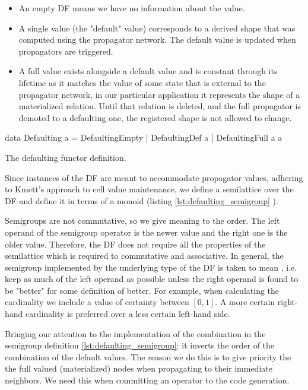 \begin{itemize}
\item An empty DF means we have no information about the value.
\item A single value (the "default" value) corresponds to a derived shape
  that was computed using the propagator network. The default value is
  updated when propagators are triggered.
\item A full value exists alongside a default value and is constant
  through its lifetime as it matches the value of some state that is
  external to the propagator network, in our particular application it
  represents the shape of a materialized relation. Until that relation
  is deleted, and the full propagator is demoted to a defaulting one, the 
  registered shape is not allowed to change.
\end{itemize}

\begin{code}
  \begin{haskellcode}
    data Defaulting a =
      DefaultingEmpty
      | DefaultingDef a
      | DefaultingFull a a
  \end{haskellcode}
  \label{lst:defaulting_functor}
  \caption{The defaulting functor definition.}
\end{code}

Since instances of the DF are meant to accommodate propagator values,
adhering to Kmett's approach to cell value maintenance, we define a
semilattice over the DF and define it in terms of a monoid (listing
\ref{lst:defaulting_semigroup} ).

Semigroups are not commutative, so we give meaning to the order. The
left operand of the semigroup operator is the newer value and the
right one is the older value. Therefore, the DF does not require all
the properties of the semilattice which is required to commutative and
associative. In general, the semigroup implemented by the underlying
type of the DF is taken to mean , i.e. keep as
much of the left operand as possible unless the right operand is found
to be "better" for some definition of better. For example, when calculating 
the cardinality we include a value of certainty between \(\left[0,1\right]\). 
A more certain right-hand cardinality is preferred over a less certain left-hand side. 

Bringing our attention to the implementation of the 
combination in the semigroup definition \ref{lst:defaulting_semigroup}: 
it inverts the order of the combination of the default
values. The reason we do this is to give priority the the full valued
(materialized) nodes when propagating to their immediate neighbors. We
need this when committing an operator to the code generation.

